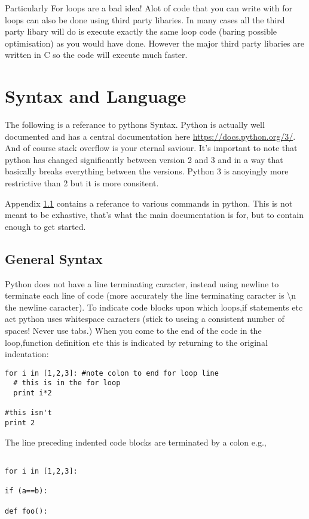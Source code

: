 \documentclass[11pt,a4paper]{article}
\begin{document}
Particularly For loops are a bad idea! Alot of code that you can write with for loops can also be done using third party libaries. In many cases all the third party libary will do is execute exactly the same loop code (baring possible optimisation) as you would have done. However the major third party libaries are written in C so the code will execute much faster.

\section{Syntax and Language}

The following is a referance to pythons  Syntax. Python is actually well documented and has a central documentation here \url{https://docs.python.org/3/}. And of course stack overflow is your eternal saviour. It's important to note that python has changed significantly between version 2 and 3 and in a way that basically breaks everything between the versions. Python 3 is anoyingly more restrictive than 2 but it is more consitent. 

Appendix \ref{} contains a referance to various commands in python. This is not meant to be exhastive, that's what the main documentation is for, but to contain enough to get started. 

\subsection{General Syntax}

Python does not have a line terminating caracter, instead using newline to terminate each line of code (more accurately the line terminating caracter is \textbackslash n the newline caracter). To indicate code blocks upon which loops,if statements etc act python uses whitespace caracters (stick to useing a consistent number of spaces! Never use tabs.) When you come to the end of the code in the loop,function definition etc this is indicated by returning to the original indentation:

\begin{verbatim}
for i in [1,2,3]: #note colon to end for loop line
  # this is in the for loop
  print i*2

#this isn't
print 2
\end{verbatim}

The line preceding indented code blocks are terminated by a colon e.g.,

\begin{verbatim}

for i in [1,2,3]:

if (a==b):

def foo():

\end{verbatim}
\end{document}
